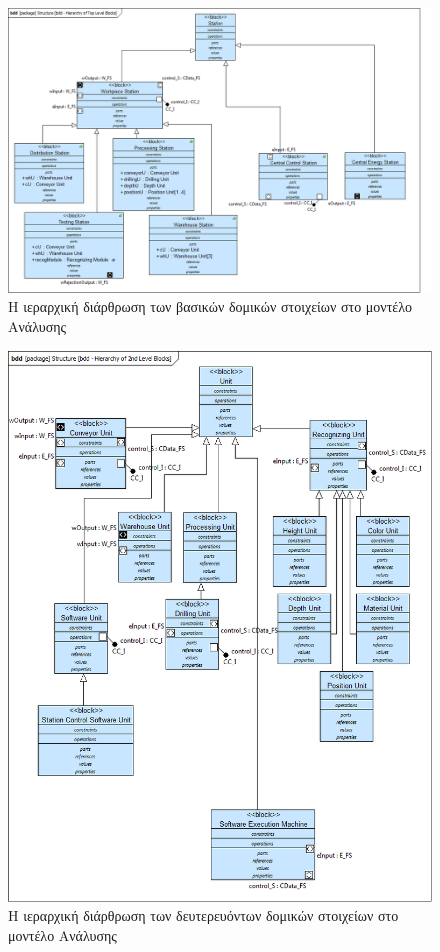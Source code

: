 \documentclass[a4paper,12pt,twoside]{report}
\begin{document}
{\begin{appendices}
			\clearpage
			\begin{figure}[hp]
					\centering
					\includegraphics[scale=0.30]{AnalysisModel_bdd-HierarchyofTopLevelBlocks.png}
					\caption{Η ιεραρχική διάρθρωση των βασικών δομικών στοιχείων στο μοντέλο Ανάλυσης}
					\label{φωτ:Η ιεραρχική διάρθρωση των βασικών δομικών στοιχείων στο μοντέλο Ανάλυσης}
			\end{figure}
			
			\begin{figure}[hp]
					\centering
					\includegraphics[scale=0.30]{AnalysisModel_bdd-Hierarchyof2ndLevelBlocks.png}
					\caption{Η ιεραρχική διάρθρωση των δευτερευόντων δομικών στοιχείων στο μοντέλο Ανάλυσης}
					\label{φωτ:Η ιεραρχική διάρθρωση των δευτερευόντων δομικών στοιχείων στο μοντέλο Ανάλυσης}
			\end{figure}
			

\end{appendices}}
\end{document}
